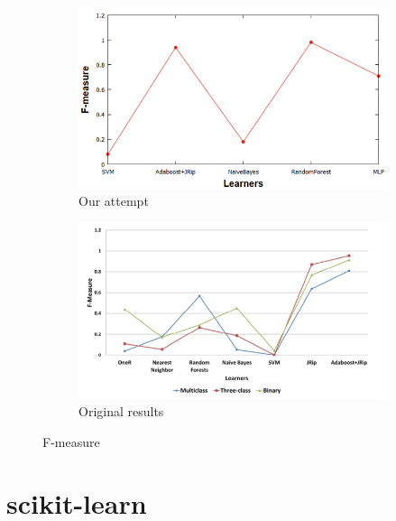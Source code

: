\begin{figure}[H]
    \centering
    \begin{subfigure}[t]{0.5\textwidth}
        \includegraphics[width=\linewidth]{images/weka_f1.png}
        \caption{Our attempt}
    \end{subfigure}%
    \begin{subfigure}[t]{0.5\textwidth}
        \includegraphics[width=\linewidth]{images/weka_f1_cite.png}
        \caption{Original results \cite{borges_hink_machine_2014-1}}
    \end{subfigure}
    \caption{F-measure}
\end{figure}

\section{scikit-learn} \label{sec:scikit_in_chap:methods}

